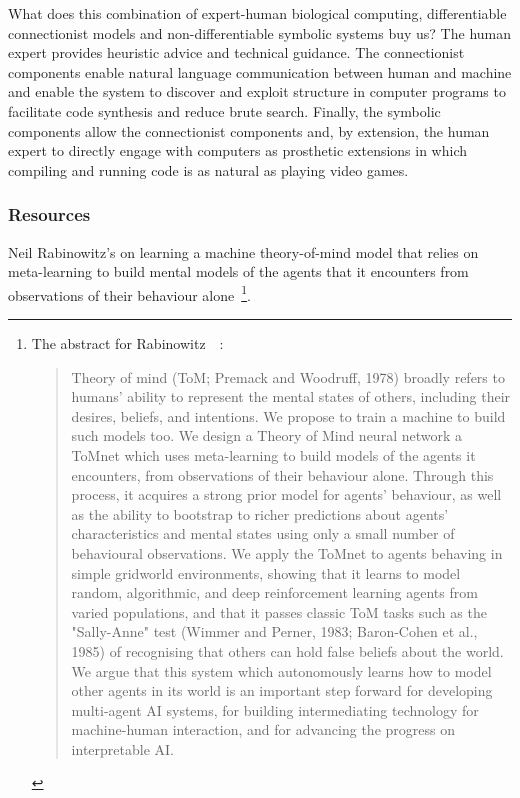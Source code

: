 What does this combination of expert-human biological computing, differentiable connectionist models and non-differentiable symbolic systems buy us? The human expert provides heuristic advice and technical guidance. The connectionist components enable natural language communication between human and machine and enable the system to discover and exploit structure in computer programs to facilitate code synthesis and reduce brute search. Finally, the symbolic components allow the connectionist components \emdash{} and, by extension, the human expert \emdash{} to directly engage with computers as prosthetic extensions in which compiling and running code is as natural as playing video games.


\subsubsection*{Resources}

Neil Rabinowitz's {} on learning a machine theory-of-mind model that relies on meta-learning to build mental models of the agents that it encounters from observations of their behaviour alone~\cite{RabinowitzetalCoRR-18}\footnote{%
%
  The abstract for Rabinowitz~\etal{}~\cite{RabinowitzetalCoRR-18}:
%
  \begin{quotation}
%
    Theory of mind (ToM; Premack and Woodruff, 1978) broadly refers to humans' ability to represent the mental states of others, including their desires, beliefs, and intentions. We propose to train a machine to build such models too. We design a Theory of Mind neural network \emdash{} a ToMnet \emdash{} which uses meta-learning to build models of the agents it encounters, from observations of their behaviour alone. Through this process, it acquires a strong prior model for agents' behaviour, as well as the ability to bootstrap to richer predictions about agents' characteristics and mental states using only a small number of behavioural observations. We apply the ToMnet to agents behaving in simple gridworld environments, showing that it learns to model random, algorithmic, and deep reinforcement learning agents from varied populations, and that it passes classic ToM tasks such as the "Sally-Anne" test (Wimmer and Perner, 1983; Baron-Cohen et al., 1985) of recognising that others can hold false beliefs about the world. We argue that this system \emdash{} which autonomously learns how to model other agents in its world \emdash{} is an important step forward for developing multi-agent AI systems, for building intermediating technology for machine-human interaction, and for advancing the progress on interpretable AI.
%
\end{quotation}}.

